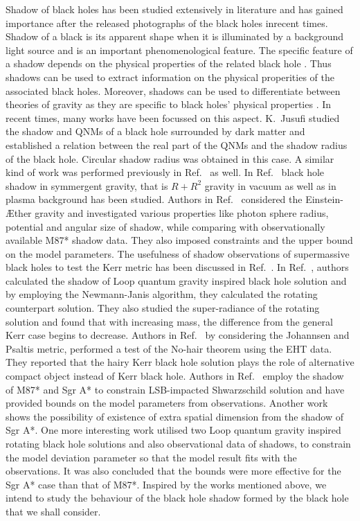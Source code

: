 \documentclass[aps,amsmath,amssymb,showpacs,showkeys]{revtex4}
\begin{document}
Shadow of black holes has been studied extensively in literature
\cite{1s,shnew02,shnew01,2s,3s,4s,5s,6s,7s,8s,9s,10s,11s,12s,13s,14s,15s,
16s,17s,18s,19s,102-1,102-2,102-3,102-4,102-5,102-6,102-7,102-8,102-9,102-10,102-11,
102-12,102-13,102-14,102-15,102-16} and has gained importance after the released photographs of the black 
holes inrecent times. Shadow of a black is its apparent shape when it is illuminated 
by a background light source and is an important phenomenological feature. 
The specific feature of a shadow depends on the physical properties of the 
related black hole \cite{3s}. Thus shadows can be used to extract information 
on the physical properities of the associated black holes. Moreover, shadows 
can be used to differentiate between theories of gravity as they are specific 
to black holes' physical properties \cite{3s}. In recent times, many works 
have been focussed on this aspect. K.\ Jusufi \cite{1s} studied the shadow and 
QNMs of a black hole surrounded by dark matter and 
established a relation between the real part of the QNMs and the shadow radius 
of the black hole. Circular shadow radius was obtained in this case. A similar 
kind of work was performed previously in Ref.\ \cite{15s} as well. In Ref.\ 
\cite{shnew01} black hole shadow in symmergent gravity, that is $R+R^2$ 
gravity in vacuum as well as in plasma background has been studied. 
Authors in Ref.\ \cite{102-2} considered the Einstein-{\AE}ther 
gravity and investigated various properties like photon sphere radius, 
potential and angular size of shadow, while comparing with observationally 
available M87* shadow data. They also imposed constraints and the upper bound 
on the model parameters. The usefulness of shadow observations of supermassive 
black holes to test the Kerr metric has been discussed in Ref.\ \cite{102-3}. 
In Ref.\ \cite{102-4}, authors calculated the shadow of Loop quantum gravity 
inspired black hole solution and by employing the Newmann-Janis algorithm, 
they calculated the rotating counterpart solution. They also studied the 
super-radiance of the rotating solution and found that with increasing mass, 
the difference from the general Kerr case begins to decrease. Authors in 
Ref.\ \cite{102-5} by considering the Johannsen and Psaltis metric, performed 
a test of the No-hair theorem using the EHT data. They reported that the hairy 
Kerr black hole solution plays the role of alternative compact object instead 
of Kerr black hole. Authors in Ref.\ \cite{102-6} employ the shadow of M87* and 
Sgr A* to constrain LSB-impacted Shwarzschild solution and have provided 
bounds on the model parameters from observations. Another work \cite{102-7} 
shows the possibility of existence of extra spatial dimension from the shadow 
of Sgr A*. One more interesting work \cite{102-8} utilised two Loop quantum 
gravity inspired rotating black hole solutions and also observational data of 
shadows, to constrain the model deviation parameter so that the model result 
fits with the observations. It was also concluded that the bounds were more 
effective for the Sgr A* case than that of M87*. Inspired by the works 
mentioned above, we intend to study the behaviour of the black hole shadow 
formed by the black hole that we shall consider. 
\end{document}
